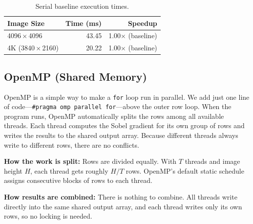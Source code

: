 \documentclass[12pt,a4paper]{article}
\begin{document}
\begin{table}[H]
\centering
\begin{tabular}{@{}lrr@{}}
\toprule
\textbf{Image Size} & \textbf{Time (ms)} & \textbf{Speedup} \\
\midrule
4096\,$\times$\,4096 & 43.45 & 1.00$\times$ (baseline) \\
4K (3840\,$\times$\,2160) & 20.22 & 1.00$\times$ (baseline) \\
\bottomrule
\end{tabular}
\caption{Serial baseline execution times.}
\label{tab:t_serial}
\end{table}

\subsection{OpenMP (Shared Memory)}
\label{subsec:openmp}

OpenMP is a simple way to make a \texttt{for} loop run in parallel. We add
just one line of code---\texttt{\#pragma omp parallel for}---above the outer
row loop. When the program runs, OpenMP automatically splits the rows among
all available threads. Each thread computes the Sobel gradient for its own
group of rows and writes the results to the shared output array. Because
different threads always write to different rows, there are no conflicts.

\textbf{How the work is split:} Rows are divided equally. With $T$ threads
and image height $H$, each thread gets roughly $H/T$ rows. OpenMP's default
static schedule assigns consecutive blocks of rows to each thread.

\textbf{How results are combined:} There is nothing to combine. All threads
write directly into the same shared output array, and each thread writes only
its own rows, so no locking is needed.
\end{document}
